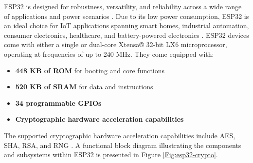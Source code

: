 ESP32 is designed for robustness, versatility, and reliability across a wide range of applications and power scenarios \cite[2]{esp32-series}. Due to its low power consumption, ESP32 is an ideal choice for \ac{IoT} applications spanning smart homes, industrial automation, consumer electronics, healthcare, and battery-powered electronics \cite[5]{esp32-series} \cite[6]{esp32-module}. ESP32 devices come with either a single or dual-core Xtensa® 32-bit LX6 microprocessor, operating at frequencies of up to 240 MHz. They come equipped with:
\begin{itemize}
    \item \textbf{448 KB of ROM} for booting and core functions \cite[4-5]{esp32-series}
    \item \textbf{520 KB of SRAM} for data and instructions \cite[4-5]{esp32-series}
    \item \textbf{34 programmable GPIOs} \cite[4-5]{esp32-series}
    \item \textbf{Cryptographic hardware acceleration capabilities} \cite[4-5]{esp32-series}
\end{itemize}

The supported cryptographic hardware acceleration capabilities include \ac{AES}, \ac{SHA}, \ac{RSA}, and \ac{RNG} \cite[4-5]{esp32-series}. A functional block diagram illustrating the components and subsystems within ESP32 is presented in Figure \ref{Fig:esp32-crypto}.

